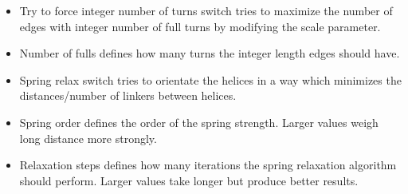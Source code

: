 \begin{itemize}
      \item Try to force integer number of turns switch tries to maximize the number of edges with integer number of full turns by modifying the scale parameter.
      \item Number of fulls defines how many turns the integer length edges should have.
      \item Spring relax switch tries to orientate the helices in a way which minimizes the distances/number of linkers between helices.
      \item Spring order defines the order of the spring strength. Larger values weigh long distance more strongly.
      \item Relaxation steps defines how many iterations the spring relaxation algorithm should perform. Larger values take longer but produce better results.
    \end{itemize}
